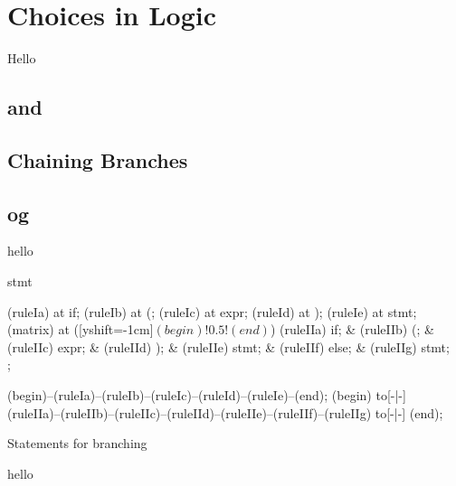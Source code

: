 \section{Choices in Logic}
\label{sec:flow:branch}

Hello

\subsection{ and }
\subsection{}
\subsection{Chaining Branches}
\subsection{ og }

\csharpsubsection{\csharp}
hello

\begin{syntaxfloat}
  \begin{syntax}{stmt}
    
    \node[terminal]    (ruleIa)  at  {if};
    \node[terminal]    (ruleIb)  at  {(};
    \node[nonterminal] (ruleIc)  at  {expr};
    \node[terminal]    (ruleId)  at  {)};
    \node[nonterminal] (ruleIe)  at  {stmt};
    \node[matrix,column sep=0.8cm] (matrix) at ([yshift=-1cm]$(begin)!0.5!(end)$) {
      \node[terminal]    (ruleIIa) {if};
      &
      \node[terminal]    (ruleIIb) {(};
      &
      \node[nonterminal] (ruleIIc) {expr};
      &
      \node[terminal]    (ruleIId) {)};
      &
      \node[nonterminal] (ruleIIe) {stmt};
      &
      \node[terminal]    (ruleIIf) {else};
      &
      \node[nonterminal] (ruleIIg) {stmt};
      \\
    };
    
    \draw[path] (begin)--(ruleIa)--(ruleIb)--(ruleIc)--(ruleId)--(ruleIe)--(end);
    \draw[path] (begin) to[-|-] (ruleIIa)--(ruleIIb)--(ruleIIc)--(ruleIId)--(ruleIIe)--(ruleIIf)--(ruleIIg) to[-|-] (end);
  \end{syntax}
  \caption{Statements for branching}
\end{syntaxfloat}

hello
